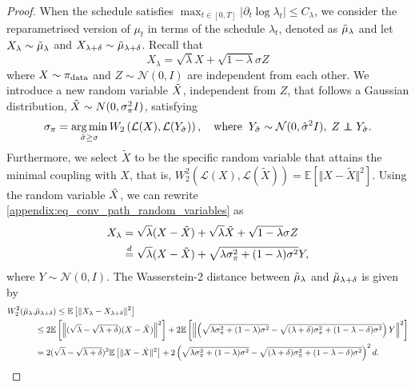 \begin{proof}
When the schedule satisfies $\max_{t\in[0,T]}\vert \partial_t{\log \lambda_t}\vert \leq C_\lambda$, we consider the reparametrised version of $\mu_t$ in terms of the schedule $\lambda_t$, denoted as $\Tilde{\mu}_\lambda$ and let $X_{\lambda}\sim\Tilde{\mu}_{\lambda}$ and $X_{\lambda + \delta}\sim\Tilde{\mu}_{\lambda + \delta}$.
Recall that 
\begin{equation}\label{appendix:eq_conv_path_random_variables}
    X_{\lambda} = \sqrt{\lambda} X + \sqrt{1-\lambda}\sigma Z 
\end{equation}
where $X\sim\operatorname*{\pi_{\text{data}}}$ and $Z\sim \mathcal{N}(0, I)$ are independent from each other. 
We introduce a new random variable $\Tilde{X}$, independent from $Z$, that follows a Gaussian distribution,  $\Tilde{X}\sim N(0, \sigma_\pi^2 I)$, satisfying 
\begin{equation*}
    \sigma_\pi = \argmin_{{\hat{\sigma}}\geq \sigma} W_2\left( \mathcal{L}(X),\mathcal{L}(Y_{\hat{\sigma}})\right), \quad \text{where} \;\; Y_{\hat{\sigma}}\sim \mathcal{N}(0, \hat{\sigma}^2 I), \; Z \independent Y_{\hat{\sigma}}.
\end{equation*}
Furthermore, we select $\tilde{X}$ to be the specific random variable that attains the minimal coupling with $X$, that is, $W_2^2\left( \mathcal{L}(X),\mathcal{L}(\tilde{X})\right) = \mathbb{E}\left[\Vert X-\tilde{X}\Vert^2\right]$.
Using the random variable $\Tilde{X}$, we can rewrite \eqref{appendix:eq_conv_path_random_variables} as
\begin{align*}
    X_\lambda &= \sqrt{\lambda} (X-\Tilde{X}) + \sqrt{\lambda} \Tilde{X} +\sqrt{1-\lambda}\sigma Z\\
    & \overset{d}{=} \sqrt{\lambda} (X-\Tilde{X}) + \sqrt{\lambda\sigma_\pi^2 + (1-\lambda)\sigma^2} Y,
\end{align*}
where $Y\sim \mathcal{N}(0, I)$.  
The Wasserstein-2 distance between $\Tilde{\mu}_\lambda$ and $\Tilde{\mu}_{\lambda+\delta}$ is given by
\begin{align*}
     W_2^2(\Tilde{\mu}_\lambda, &\Tilde{\mu}_{\lambda+\delta}) \leq \mathbb{E}\left[\Vert X_\lambda-X_{\lambda + \delta}\Vert^2\right]\\
&\leq 2\mathbb{E}\left[\left\Vert(\sqrt{\lambda}-\sqrt{\lambda+\delta})(X-\Tilde{X})\right\Vert^2\right] +2 \mathbb{E}\left[\left\Vert\left(\sqrt{\lambda\sigma_{\pi}^2 + (1-\lambda)\sigma^2}-\sqrt{(\lambda + \delta)\sigma_{\pi}^2 +(1-\lambda-\delta)\sigma^2}\right) Y\right\Vert^2\right]\\
&= 2(\sqrt{\lambda}-\sqrt{\lambda+\delta})^2 \mathbb{E}\left[\Vert X-\Tilde{X}\Vert^2\right] + 2\left(\sqrt{\lambda\sigma_{\pi}^2 + (1-\lambda)\sigma^2}-\sqrt{(\lambda + \delta)\sigma_{\pi}^2 +(1-\lambda-\delta)\sigma^2}\right)^2d.

\end{align*}
\end{proof}
